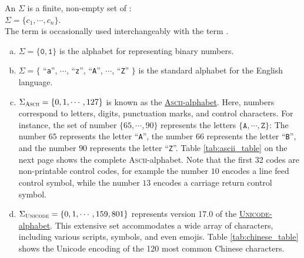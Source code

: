 \begin{Definition}[Alphabet]
An  \( \Sigma \)  is a finite, non-empty set of :
\\[0.2cm]
\hspace*{1.3cm}
\( \Sigma = \{ c_1, \cdots, c_n \} \).
\\[0.2cm]
The term   is occasionally used interchangeably with the term .
\eox
\end{Definition}

\examplesEng
\begin{enumerate}[(a)]
\item \( \Sigma = \{ \mathtt{0}, \mathtt{1} \} \) is the alphabet for representing binary numbers.
\item $\Sigma = \{$ ``\texttt{a}'', $\cdots$, ``\texttt{z}'', ``\texttt{A}'', $\cdots$, ``\texttt{Z}'' $\}$ 
      is the standard alphabet for the English language.
\item \( \Sigma_{\textsc{\scriptsize Ascii}} = \{ 0, 1, \cdots, 127 \} \) is known as the
      \href{http://en.wikipedia.org/wiki/ASCII}{\textsc{Ascii}-alphabet}.  Here,
      numbers correspond to letters, digits, punctuation marks, and control characters. For instance, the set
      of number \( \{ 65, \cdots, 90 \} \) represents the letters \( \{ \texttt{A}, \cdots, \texttt{Z} \} \):
      The number $65$ represents the letter ``\texttt{A}'', the number $66$ represents the letter
      ``\texttt{B}'', and the number $90$ represents the letter ``\texttt{Z}''.
      Table \ref{tab:ascii_table} on the next page shows the complete \textsc{Ascii}-alphabet.  Note that the
      first 32 codes are non-printable control codes, for example the number $10$ encodes a line feed control
      symbol, while the number $13$ encodes a carriage return control symbol.
      
\item \( \Sigma_{\textsc{\scriptsize Unicode}} = \{ 0, 1, \cdots, 159,801 \} \) represents version 17.0 of the
      \href{https://en.wikipedia.org/wiki/Unicode}{\textsc{Unicode}-alphabet}. 
      This extensive set accommodates a wide array of characters, including various scripts, symbols, and even
      emojis.  Table \ref{tab:chinese_table} shows the Unicode encoding of the 120 most common Chinese characters.
\eox
\end{enumerate}

